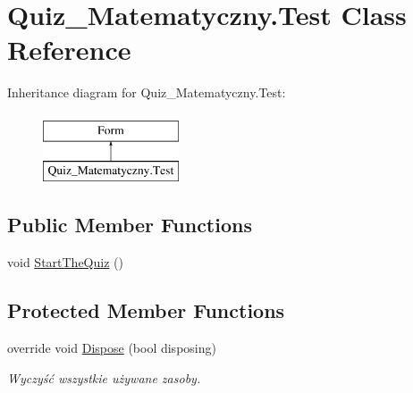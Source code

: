 \hypertarget{class_quiz___matematyczny_1_1_test}{}\section{Quiz\+\_\+\+Matematyczny.\+Test Class Reference}
\label{class_quiz___matematyczny_1_1_test}
Inheritance diagram for Quiz\+\_\+\+Matematyczny.\+Test\+:\begin{figure}[H]
\begin{center}
\leavevmode
\includegraphics[height=2.000000cm]{class_quiz___matematyczny_1_1_test}
\end{center}
\end{figure}
\subsection*{Public Member Functions}
\begin{DoxyCompactItemize}
\item 
void \mbox{\hyperlink{class_quiz___matematyczny_1_1_test_a1573753aacf25f312207d67b109e96bf}{Start\+The\+Quiz}} ()
\end{DoxyCompactItemize}
\subsection*{Protected Member Functions}
\begin{DoxyCompactItemize}
\item 
override void \mbox{\hyperlink{class_quiz___matematyczny_1_1_test_a85b3e2c740c7989fdaa2d8c3db872ba1}{Dispose}} (bool disposing)
\begin{DoxyCompactList}\small\item\em Wyczyść wszystkie używane zasoby. \end{DoxyCompactList}\end{DoxyCompactItemize}
